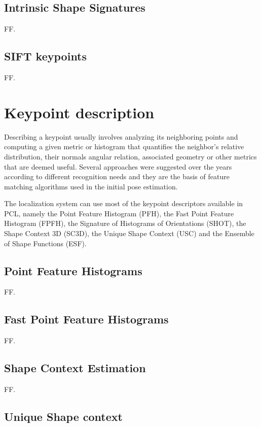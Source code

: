 \subsection{Intrinsic Shape Signatures}

FF.


\subsection{SIFT keypoints}

FF.



\section{Keypoint description}

Describing a keypoint usually involves analyzing its neighboring points and computing a given metric or histogram that quantifies the neighbor’s relative distribution, their normals angular relation, associated geometry or other metrics that are deemed useful. Several approaches were suggested over the years according to different recognition needs and they are the basis of feature matching algorithms used in the initial pose estimation.

The localization system can use most of the keypoint descriptors available in PCL, namely the Point Feature Histogram (PFH), the Fast Point Feature Histogram (FPFH), the Signature of Histograms of Orientations (SHOT), the Shape Context 3D (SC3D), the Unique Shape Context (USC) and the Ensemble of Shape Functions (ESF).


\subsection{Point Feature Histograms}

FF.


\subsection{Fast Point Feature Histograms}

FF.


\subsection{Shape Context Estimation}

FF.


\subsection{Unique Shape context}

